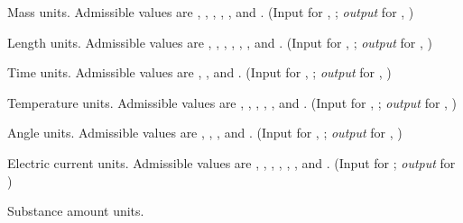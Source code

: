 \begin{Ventryi}{}\raggedright
\item [\fort{mass}]
      Mass units.
      Admissible values are , ,
      , , , and
      .
      (\textcolor{input}{Input} for ,
      ;
      \textcolor{output}{\textit{output}} for ,
      )
\item [\fort{length}]
      Length units.
      Admissible values are , ,
      , , ,
      , and .
      (\textcolor{input}{Input} for ,
      ;
      \textcolor{output}{\textit{output}} for ,
      )
\item [\fort{time}]
      Time units.
      Admissible values are , , and
      .
      (\textcolor{input}{Input} for ,
      ;
      \textcolor{output}{\textit{output}} for ,
      )
\item [\fort{temperature}]
      Temperature units.
      Admissible values are , ,
      , , , and
      .
      (\textcolor{input}{Input} for ,
      ;
      \textcolor{output}{\textit{output}} for ,
      )
\item [\fort{angle}]
      Angle units.
      Admissible values are , ,
      , and .
      (\textcolor{input}{Input} for ,
      ;
      \textcolor{output}{\textit{output}} for ,
      )
\item [\fort{current}]
      Electric current units.
      Admissible values are , ,
      , , ,
      , and .
      (\textcolor{input}{Input} for ;
      \textcolor{output}{\textit{output}} for )
\item [\fort{amount}]
      Substance amount units.

\end{Ventryi}
